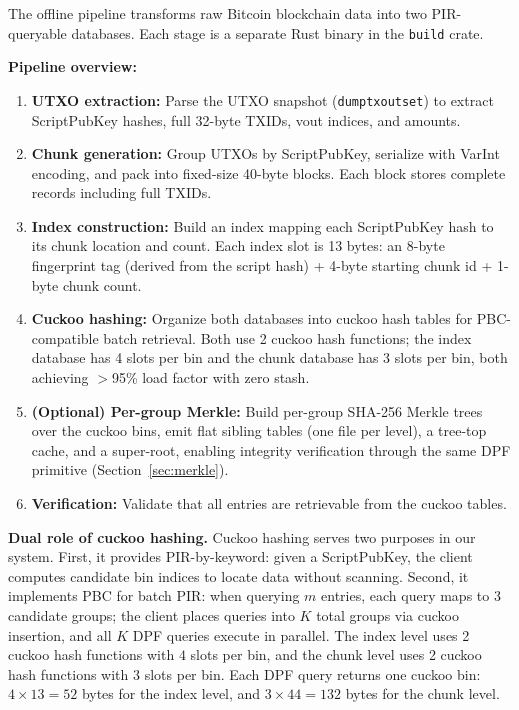 The offline pipeline transforms raw Bitcoin blockchain data into two PIR-queryable databases. Each stage is a separate Rust binary in the \texttt{build} crate.

\textbf{Pipeline overview:}
\begin{enumerate}[nolistsep,leftmargin=*]
    \item \textbf{UTXO extraction:} Parse the UTXO snapshot (\texttt{dumptxoutset}) to extract ScriptPubKey hashes, full 32-byte TXIDs, vout indices, and amounts.
    \item \textbf{Chunk generation:} Group UTXOs by ScriptPubKey, serialize with VarInt encoding, and pack into fixed-size 40-byte blocks. Each block stores complete records including full TXIDs.
    \item \textbf{Index construction:} Build an index mapping each ScriptPubKey hash to its chunk location and count. Each index slot is 13 bytes: an 8-byte fingerprint tag (derived from the script hash) + 4-byte starting chunk id + 1-byte chunk count.
    \item \textbf{Cuckoo hashing:} Organize both databases into cuckoo hash tables for PBC-compatible batch retrieval. Both use 2 cuckoo hash functions; the index database has 4 slots per bin and the chunk database has 3 slots per bin, both achieving $>$95\% load factor with zero stash.
    \item \textbf{(Optional) Per-group Merkle:} Build per-group SHA-256 Merkle trees over the cuckoo bins, emit flat sibling tables (one file per level), a tree-top cache, and a super-root, enabling integrity verification through the same DPF primitive (Section~\ref{sec:merkle}).
    \item \textbf{Verification:} Validate that all entries are retrievable from the cuckoo tables.
\end{enumerate}

\textbf{Dual role of cuckoo hashing.} Cuckoo hashing serves two purposes in our system. First, it provides PIR-by-keyword: given a ScriptPubKey, the client computes candidate bin indices to locate data without scanning. Second, it implements PBC for batch PIR: when querying $m$ entries, each query maps to $3$ candidate groups; the client places queries into $K$ total groups via cuckoo insertion, and all $K$ DPF queries execute in parallel. The index level uses 2 cuckoo hash functions with $4$ slots per bin, and the chunk level uses 2 cuckoo hash functions with $3$ slots per bin. Each DPF query returns one cuckoo bin: $4 \times 13 = 52$ bytes for the index level, and $3 \times 44 = 132$ bytes for the chunk level.

